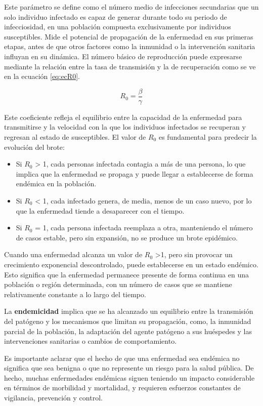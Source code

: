 Este parámetro se define como el número medio de infecciones secundarias que un solo individuo infectado es capaz de generar durante todo su periodo de infecciosidad, en una población compuesta exclusivamente por individuos susceptibles. Mide el potencial de propagación de la enfermedad en sus primeras etapas, antes de que otros factores como la inmunidad o la intervención sanitaria influyan en su dinámica.
El número básico de reproducción puede expresarse mediante la relación entre la tasa de transmisión y la de recuperación como se ve en la ecuación \ref{eq:ecR0}.

\begin{equation}
R_0 = \frac{\beta}{\gamma}
\label{eq:ecR0}
\end{equation}

Este coeficiente refleja el equilibrio entre la capacidad de la enfermedad para transmitirse y la velocidad con la que los individuos infectados se recuperan y regresan al estado de susceptibles. 
El valor de $R_0$ es fundamental para predecir la evolución del brote:
\begin{itemize}
    \item Si $R_0$ > 1, cada personas infectada contagia a más de una persona, lo que implica que la enfermedad se propaga y puede llegar a establecerse de forma endémica en la población.
    \item Si $R_0$ < 1, cada infectado genera, de media, menos de un caso nuevo, por lo que la enfermedad tiende a desaparecer con el tiempo.
    \item Si $R_0$ = 1, cada persona infectada reemplaza a otra, manteniendo el número de casos estable, pero sin expansión, no se produce un brote epidémico.
\end{itemize}
	
Cuando una enfermedad alcanza un valor de $R_0$ >1, pero sin provocar un crecimiento exponencial descontrolado, puede establecerse en un estado endémico. Esto significa que la enfermedad permanece presente de forma continua en una población o región determinada, con un número de casos que se mantiene relativamente constante a lo largo del tiempo.

La \textbf{endemicidad} implica que se ha alcanzado un equilibrio entre la transmisión del patógeno y los mecanismos que limitan su propagación, como, la inmunidad parcial de la población, la adaptación del agente patógeno a sus huéspedes y las intervenciones sanitarias o cambios de comportamiento.

Es importante aclarar que el hecho de que una enfermedad sea endémica no significa que sea benigna o que no represente un riesgo para la salud pública. De hecho, muchas enfermedades endémicas siguen teniendo un impacto considerable en términos de morbilidad y mortalidad, y requieren esfuerzos constantes de vigilancia, prevención y control.

